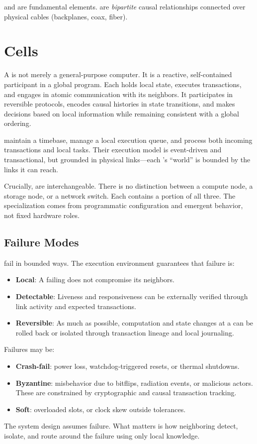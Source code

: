 \documentclass[../../../OAE-SPEC-MAIN.tex]{subfiles}
\begin{document}
\CELLs and \LINKs are  fundamental elements. \LINKs are \emph{bipartite} causal relationships connected over physical cables (backplanes, coax, fiber). 


\section{Cells}

A \CELL is not merely a general-purpose computer. It is a reactive, self-contained participant in a global program. Each \CELL holds local state, executes transactions, and engages in atomic communication with its neighbors. It participates in reversible protocols, encodes causal histories in state transitions, and makes decisions based on local information while remaining consistent with a global ordering.

\CELLs maintain a timebase, manage a local execution queue, and process both incoming transactions and local tasks. Their execution model is event-driven and transactional, but grounded in physical links—each \CELL’s “world” is bounded by the links it can reach.

Crucially, \CELLs are interchangeable. There is no distinction between a compute node, a storage node, or a network switch. Each \CELL contains a portion of all three. The specialization comes from programmatic configuration and emergent behavior, not fixed hardware roles.

\subsection{Failure Modes}

\CELLs fail in bounded ways. The execution environment guarantees that failure is:
\begin{itemize}
\item \textbf{Local}: A failing \CELL does not compromise its neighbors.
\item \textbf{Detectable}: Liveness and responsiveness can be externally verified through link activity and expected transactions.
\item \textbf{Reversible}: As much as possible, computation and state changes at a \CELL can be rolled back or isolated through transaction lineage and local journaling.
\end{itemize}

Failures may be:
\begin{itemize}
\item \textbf{Crash-fail}: power loss, watchdog-triggered resets, or thermal shutdowns.
\item \textbf{Byzantine}: misbehavior due to bitflips, radiation events, or malicious actors. These are constrained by cryptographic and causal transaction tracking.
\item \textbf{Soft}: overloaded slots, or clock skew outside tolerances.
\end{itemize}

The system design assumes failure. What matters is how neighboring \CELLs detect, isolate, and route around the failure using only local knowledge.
\end{document}
